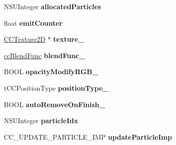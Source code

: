 \begin{DoxyCompactItemize}
\item 
\hypertarget{interface_c_c_particle_system_a894451580cc527d1d121b3fedd2d3e8c}{N\-S\-U\-Integer {\bfseries allocated\-Particles}}\label{interface_c_c_particle_system_a894451580cc527d1d121b3fedd2d3e8c}

\item 
\hypertarget{interface_c_c_particle_system_a008b004ee07979aae53430734228dd48}{float {\bfseries emit\-Counter}}\label{interface_c_c_particle_system_a008b004ee07979aae53430734228dd48}

\item 
\hypertarget{interface_c_c_particle_system_aee907c84c68d2f29b75e876d9094d1f2}{\hyperlink{class_c_c_texture2_d}{C\-C\-Texture2\-D} $\ast$ {\bfseries texture\-\_\-}}\label{interface_c_c_particle_system_aee907c84c68d2f29b75e876d9094d1f2}

\item 
\hypertarget{interface_c_c_particle_system_a5656f695bfe98f339fe019283f884941}{\hyperlink{cc_types_8h_a8c19c6f67219ecc0a6e4740cc046008d}{cc\-Blend\-Func} {\bfseries blend\-Func\-\_\-}}\label{interface_c_c_particle_system_a5656f695bfe98f339fe019283f884941}

\item 
\hypertarget{interface_c_c_particle_system_a964e6c5072bd007e72574123d613aa3d}{B\-O\-O\-L {\bfseries opacity\-Modify\-R\-G\-B\-\_\-}}\label{interface_c_c_particle_system_a964e6c5072bd007e72574123d613aa3d}

\item 
\hypertarget{interface_c_c_particle_system_ae911959fdef7ac335e9870188cc5203c}{t\-C\-C\-Position\-Type {\bfseries position\-Type\-\_\-}}\label{interface_c_c_particle_system_ae911959fdef7ac335e9870188cc5203c}

\item 
\hypertarget{interface_c_c_particle_system_a7f7dfb082d8320167e408f669ed1afb0}{B\-O\-O\-L {\bfseries auto\-Remove\-On\-Finish\-\_\-}}\label{interface_c_c_particle_system_a7f7dfb082d8320167e408f669ed1afb0}

\item 
\hypertarget{interface_c_c_particle_system_a77b479fe5657a118abe0d09aaefb8b85}{N\-S\-U\-Integer {\bfseries particle\-Idx}}\label{interface_c_c_particle_system_a77b479fe5657a118abe0d09aaefb8b85}

\item 
\hypertarget{interface_c_c_particle_system_a82d3be08437b59036d60670d12057c17}{C\-C\-\_\-\-U\-P\-D\-A\-T\-E\-\_\-\-P\-A\-R\-T\-I\-C\-L\-E\-\_\-\-I\-M\-P {\bfseries update\-Particle\-Imp}}\label{interface_c_c_particle_system_a82d3be08437b59036d60670d12057c17}


\end{DoxyCompactItemize}
